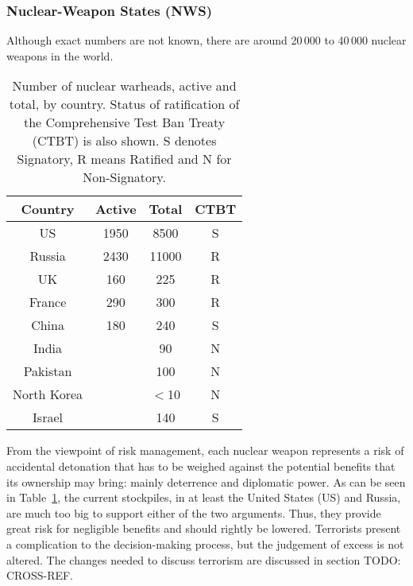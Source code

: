 \documentclass[twoside,titlepage,11pt,twocolumn,a4paper]{article}
\begin{document}
\subsubsection{Nuclear-Weapon States (NWS)}
Although exact numbers are not known, there are around 20\,000 to
40\,000 nuclear weapons in the world. \citep{worldNuclearForces2011,
  norris2010}

\begin{table}
  \begin{tabular}{|c|c|c|c|}
    \hline
    Country	& Active& Total		& CTBT	\\
    \hline
    US		& 1950 	& 8500		& S	\\
    Russia	& 2430 	& 11000		& R	\\
    UK		& 160 	& 225		& R	\\
    France	& 290	& 300		& R	\\
    China	& 180	& 240		& S	\\
    India	&	& 90		& N	\\
    Pakistan	&	& 100		& N	\\
    North Korea	&	& \(<\)10	& N	\\
    Israel	&	& 140		& S	\\
    \hline
  \end{tabular}
  \caption{Number of nuclear warheads, active and total, by
    country. Status of ratification of the Comprehensive Test Ban
    Treaty (CTBT) is also shown. S denotes Signatory, R means Ratified
    and N for Non-Signatory. \citep{worldNuclearForces2011}}
  \label{tab:NWSwarheadsCTBT}
\end{table}

From the viewpoint of risk management, each nuclear weapon represents
a risk of accidental detonation that has to be weighed against the
potential benefits that its ownership may bring: mainly deterrence and
diplomatic power. As can be seen in Table~\ref{tab:NWSwarheadsCTBT},
the current stockpiles, in at least the United States (US) and Russia,
are much too big to support either of the two arguments. Thus, they
provide great risk for negligible benefits and should rightly be
lowered. Terrorists present a complication to the decision-making
process, but the judgement of excess is not altered. The changes
needed to discuss terrorism are discussed in section TODO: CROSS-REF.
\end{document}
